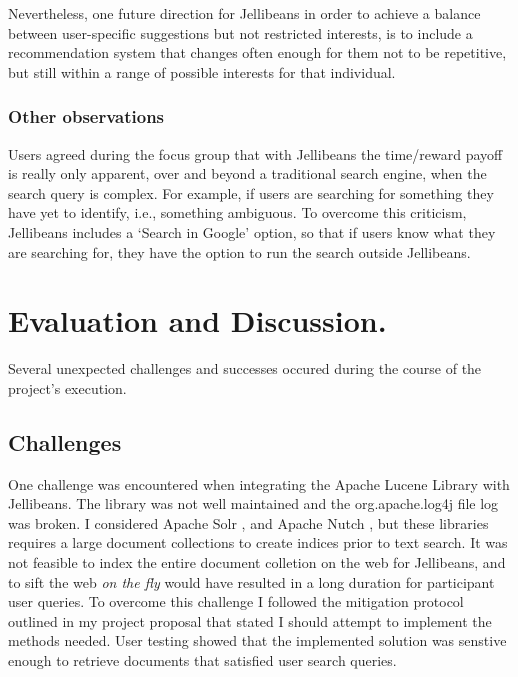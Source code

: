 \documentclass[a4paper, 11pt]{article}
\begin{document}
\vspace{5mm}
Nevertheless, one future direction for Jellibeans in order to achieve a balance between user-specific suggestions but not restricted interests, is to include a recommendation system that changes often enough for them not to be repetitive, but still within a range of possible interests for that individual. 

\subsubsection{Other observations}

Users agreed during the focus group that with Jellibeans the time/reward payoff is really only apparent, over and beyond a traditional search engine, when the search query is complex. For example, if users are searching for something they have yet to identify, i.e., something ambiguous. To overcome this criticism, Jellibeans includes a `Search in Google' option, so that if users know what they are searching for, they have the option to run the search outside Jellibeans.

\section{Evaluation and Discussion.}\label{eval}

Several unexpected challenges and successes occured during the course of the project's execution.  

\subsection {Challenges}
One challenge was encountered when integrating the Apache Lucene Library with Jellibeans. The library was not well maintained and the org.apache.log4j file log was broken. I considered Apache Solr \cite{solr}, and Apache Nutch \cite{nutch}, but these libraries requires a large document collections to create indices prior to text search. It was not feasible to index the entire document colletion on the web for Jellibeans, and to sift the web \textit{on the fly} would have resulted in a long duration for participant user queries. To overcome this challenge I followed the mitigation protocol outlined in my project proposal that stated I should attempt to implement the methods needed. User testing showed that the implemented solution was senstive enough to retrieve documents that satisfied user search queries.
\end{document}
